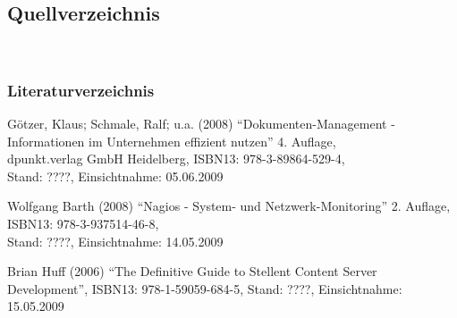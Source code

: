 \documentclass[12pt, a4paper, headsepline]{article}
\begin{document}
\subsection{Quellverzeichnis}

\\

\subsubsection{Literaturverzeichnis}

\begin{thebibliography}{xxxxxxxx}
	 Götzer, Klaus; Schmale, Ralf; u.a. (2008) "`Dokumenten-Management - Informationen im Unternehmen effizient nutzen"' 4. Auflage,\\
	 dpunkt.verlag GmbH Heidelberg,  
	 ISBN13: 978-3-89864-529-4,\\
	 Stand: ????, Einsichtnahme: 05.06.2009

	 Wolfgang Barth (2008) "`Nagios - System- und Netzwerk-Monitoring"' 2. Auflage, \\
	 ISBN13: 978-3-937514-46-8, \\
	 Stand: ????, Einsichtnahme: 14.05.2009
	 
	 Brian Huff (2006) "`The Definitive Guide to Stellent Content Server Development"', \newline ISBN13: 978-1-59059-684-5, \newline Stand: ????, Einsichtnahme: 15.05.2009


	 	
\end{thebibliography}
\newpage
\end{document}
